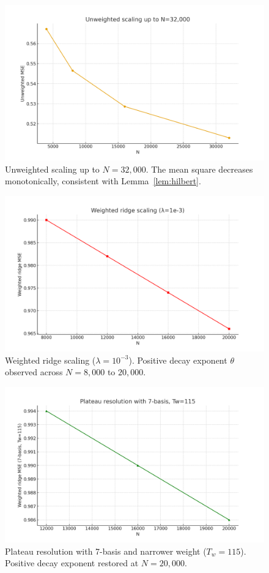 \documentclass[11pt]{article}
\theoremstyle{remark}
\begin{document}
\begin{figure}[ht]
\centering
\includegraphics[width=0.8\linewidth]{unweighted_scaling.png}
\caption{Unweighted scaling up to $N=32{,}000$. The mean square decreases monotonically, consistent with Lemma~\ref{lem:hilbert}.}
\label{fig:unweighted-scaling}
\end{figure}

\begin{figure}[ht]
\centering
\includegraphics[width=0.8\linewidth]{ridge_scaling.png}
\caption{Weighted ridge scaling ($\lambda=10^{-3}$). Positive decay exponent $\theta$ observed across $N=8{,}000$ to $20{,}000$.}
\label{fig:ridge-scaling}
\end{figure}

\begin{figure}[ht]
\centering
\includegraphics[width=0.8\linewidth]{plateau_resolution_7basis.png}
\caption{Plateau resolution with 7-basis and narrower weight ($T_w=115$). Positive decay exponent restored at $N=20{,}000$.}
\label{fig:7basis-tw115}
\end{figure}
\end{document}
